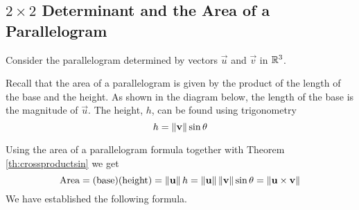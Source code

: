 \documentclass{ximera}
\begin{document}




\subsection*{$2\times 2$ Determinant and the Area of a Parallelogram}

Consider the parallelogram determined by vectors $\vec{u}$ and $\vec{v}$ in $\mathbb{R}^3$.

\begin{center}
\end{center}

Recall that the area of a parallelogram is given by the product of the length of the base and the height.
As shown in the diagram below, the length of the base is the magnitude of $\vec{u}$. The height, $h$, can be found using trigonometry $$h=\left\lVert\mathbf{v}\right\rVert\sin\theta$$ 
\begin{center}
\end{center}
Using the area of a parallelogram formula together with Theorem \ref{th:crossproductsin} we get
$$\mbox{Area}=(\text{base})(\text{height})=\left\lVert\mathbf{u}\right\rVert h=\left\lVert\mathbf{u}\right\rVert\left\lVert\mathbf{v}\right\rVert\sin\theta=\left\lVert\mathbf{u}\times\mathbf{v}\right\rVert$$
We have established the following formula.
\end{document}

